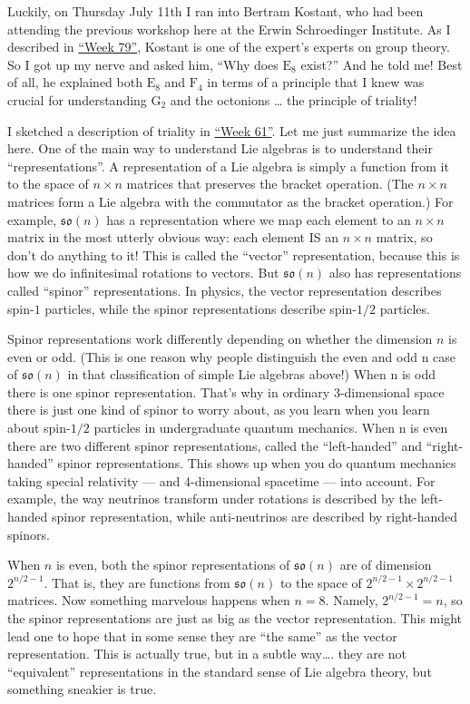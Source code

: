 \documentclass{article}
\begin{document}
Luckily, on Thursday July 11th I ran into Bertram Kostant, who had been
attending the previous workshop here at the Erwin Schroedinger
Institute. As I described in \protect\hyperlink{week79}{``Week 79''},
Kostant is one of the expert's experts on group theory. So I got up my
nerve and asked him, ``Why does \(\mathrm{E}_8\) exist?'' And he told
me! Best of all, he explained both \(\mathrm{E}_8\) and \(\mathrm{F}_4\)
in terms of a principle that I knew was crucial for understanding
\(\mathrm{G}_2\) and the octonions \ldots{} the principle of triality!

I sketched a description of triality in
\protect\hyperlink{week61}{``Week 61''}. Let me just summarize the idea
here. One of the main way to understand Lie algebras is to understand
their ``representations''. A representation of a Lie algebra is simply a
function from it to the space of \(n\times n\) matrices that preserves
the bracket operation. (The \(n\times n\) matrices form a Lie algebra
with the commutator as the bracket operation.) For example,
\(\mathfrak{so}(n)\) has a representation where we map each element to
an \(n\times n\) matrix in the most utterly obvious way: each element IS
an \(n\times n\) matrix, so don't do anything to it! This is called the
``vector'' representation, because this is how we do infinitesimal
rotations to vectors. But \(\mathfrak{so}(n)\) also has representations
called ``spinor'' representations. In physics, the vector representation
describes spin-\(1\) particles, while the spinor representations
describe spin-\(1/2\) particles.

Spinor representations work differently depending on whether the
dimension \(n\) is even or odd. (This is one reason why people
distinguish the even and odd n case of \(\mathfrak{so}(n)\) in that
classification of simple Lie algebras above!) When n is odd there is one
spinor representation. That's why in ordinary 3-dimensional space there
is just one kind of spinor to worry about, as you learn when you learn
about spin-\(1/2\) particles in undergraduate quantum mechanics. When n
is even there are two different spinor representations, called the
``left-handed'' and ``right-handed'' spinor representations. This shows
up when you do quantum mechanics taking special relativity --- and
4-dimensional spacetime --- into account. For example, the way neutrinos
transform under rotations is described by the left-handed spinor
representation, while anti-neutrinos are described by right-handed
spinors.

When \(n\) is even, both the spinor representations of
\(\mathfrak{so}(n)\) are of dimension \(2^{n/2 - 1}\). That is, they are
functions from \(\mathfrak{so}(n)\) to the space of
\(2^{n/2 - 1} \times 2^{n/2 - 1}\) matrices. Now something marvelous
happens when \(n = 8\). Namely, \(2^{n/2 - 1} = n\), so the spinor
representations are just as big as the vector representation. This might
lead one to hope that in some sense they are ``the same'' as the vector
representation. This is actually true, but in a subtle way\ldots. they
are not ``equivalent'' representations in the standard sense of Lie
algebra theory, but something sneakier is true.
\end{document}
